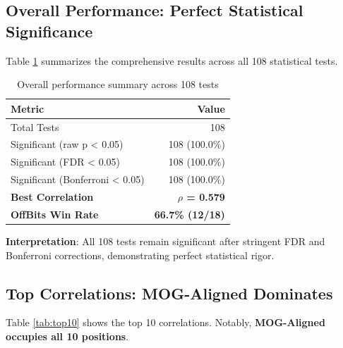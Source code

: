 \documentclass[11pt,letterpaper]{article}
\begin{document}
\subsection{Overall Performance: Perfect Statistical Significance}

Table \ref{tab:overall} summarizes the comprehensive results across all 108 statistical tests.

\begin{table}[H]
\centering
\caption{Overall performance summary across 108 tests}
\label{tab:overall}
\begin{tabular}{lr}
\toprule
\textbf{Metric} & \textbf{Value} \\
\midrule
Total Tests & 108 \\
Significant (raw p < 0.05) & 108 (100.0\%) \\
Significant (FDR < 0.05) & 108 (100.0\%) \\
Significant (Bonferroni < 0.05) & 108 (100.0\%) \\
\textbf{Best Correlation} & \textbf{$\rho$ = 0.579} \\
\textbf{OffBits Win Rate} & \textbf{66.7\% (12/18)} \\
\bottomrule
\end{tabular}
\end{table}

\textbf{Interpretation}: All 108 tests remain significant after stringent FDR and Bonferroni corrections, demonstrating perfect statistical rigor.

\subsection{Top Correlations: MOG-Aligned Dominates}

Table \ref{tab:top10} shows the top 10 correlations. Notably, \textbf{MOG-Aligned occupies all 10 positions}.
\end{document}
